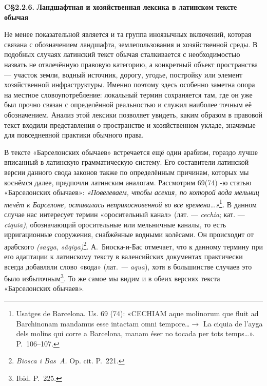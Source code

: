 \textbf{C}\textbf{§2.2.6}\textbf{.}\textbf{ Ландшафтная и хозяйственная лексика в латинском тексте обычая}

Не менее показательной является и та группа иноязычных включений, которая связана с обозначением ландшафта, землепользования и хозяйственной среды. В подобных случаях латинский текст обычая сталкивается с необходимостью назвать не отвлечённую правовую категорию, а конкретный объект пространства --- участок земли, водный источник, дорогу, угодье, постройку или элемент хозяйственной инфраструктуры. Именно поэтому здесь особенно заметна опора на местное словоупотребление: локальный термин сохраняется там, где он уже был прочно связан с определённой реальностью и служил наиболее точным её обозначением. Анализ этой лексики позволяет увидеть, каким образом в правовой текст входили представления о пространстве и хозяйственном укладе, значимые для повседневной практики обычного права.

В тексте «Барселонских обычаев» встречается ещё один арабизм, гораздо лучше вписанный в латинскую грамматическую систему. Его составители латинской версии данного свода законов также по определённым причинам, которых мы коснёмся далее, предпочли латинским аналогам. Рассмотрим 69(74) -ю статью «Барселонских обычаев»: \emph{«Повелеваем, чтобы асекия, по которой вода мельниц течёт к Барселоне, оставалась неприкосновенной во все времена…»}\footnote{Usatges de Barcelona. Us. 69 (74): «CECHIAM aque molinorum que fluit ad Barchinonam mandamus esse intactam omni tempore…$\rightarrow$ La ciquia de l'ayga dels molins qui corre a Barcelona, manam éser no tocada per tots temps…». P.~106--107.}\emph{.} В данном случае нас интересует термин «оросительный канал»\emph{ }(лат. ---\emph{ }\emph{cechia}; кат. ---\emph{ }\emph{ciquia}\emph{)}, обозначающий оросительные или мельничные каналы, то есть ирригационные сооружения, снабжённые водными колёсами. Он происходит от арабского  \emph{(saqya, sâqiya)}\footnote{\emph{Biosca i Bas~A.} Op. cit. P.~221.}. А.~Биоска-и-Бас отмечает, что к данному термину при его адаптации к латинскому тексту в валенсийских документах практически всегда добавляли слово «вода» (лат.\emph{ --- }\emph{aqua}), хотя в большинстве случаев это было избыточным\footnote{Ibid. P.~225.}. То же самое мы видим и в обеих версиях текста «Барселонских обычаев».

